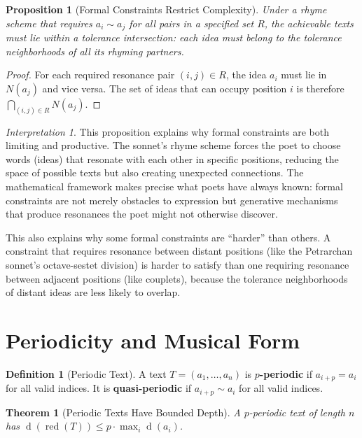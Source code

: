 \documentclass[11pt,openany]{book}
\theoremstyle{definition}
\newtheorem{definition}[axiom]{Definition}
\theoremstyle{plain}
\newtheorem{theorem}[axiom]{Theorem}
\newtheorem{proposition}[axiom]{Proposition}
\theoremstyle{remark}
\newtheorem{interpretation}[axiom]{Interpretation}
\newcommand{\res}{\sim}                      %
\newcommand{\depth}{\operatorname{d}}       %
\begin{document}
\begin{proposition}[Formal Constraints Restrict Complexity]
Under a rhyme scheme that requires $a_i \res a_j$ for all pairs in a specified set $R$, the achievable texts must lie within a \emph{tolerance intersection}: each idea must belong to the tolerance neighborhoods of all its rhyming partners.
\end{proposition}

\begin{proof}
For each required resonance pair $(i,j) \in R$, the idea $a_i$ must lie in $N(a_j)$ and vice versa. The set of ideas that can occupy position $i$ is therefore $\bigcap_{(i,j) \in R} N(a_j)$.
\end{proof}

\begin{interpretation}
This proposition explains why formal constraints are both limiting and productive. The sonnet's rhyme scheme forces the poet to choose words (ideas) that resonate with each other in specific positions, reducing the space of possible texts but also creating unexpected connections. The mathematical framework makes precise what poets have always known: formal constraints are not merely obstacles to expression but generative mechanisms that produce resonances the poet might not otherwise discover.

This also explains why some formal constraints are ``harder'' than others. A constraint that requires resonance between distant positions (like the Petrarchan sonnet's octave-sestet division) is harder to satisfy than one requiring resonance between adjacent positions (like couplets), because the tolerance neighborhoods of distant ideas are less likely to overlap.
\end{interpretation}

\section{Periodicity and Musical Form}

\begin{definition}[Periodic Text]
A text $T = (a_1, \ldots, a_n)$ is \textbf{$p$-periodic} if $a_{i+p} = a_i$ for all valid indices. It is \textbf{quasi-periodic} if $a_{i+p} \res a_i$ for all valid indices.
\end{definition}

\begin{theorem}[Periodic Texts Have Bounded Depth]
A $p$-periodic text of length $n$ has $\depth(\operatorname{red}(T)) \leq p \cdot \max_i \depth(a_i)$.
\end{theorem}
\end{document}
